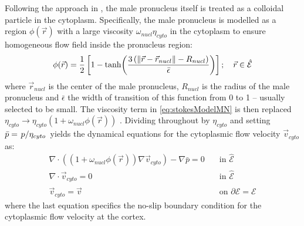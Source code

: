 Following the approach in \citep{tanaka2000simulation}, the male pronucleus itself is treated as a colloidal particle in the cytoplasm. Specifically, the male pronucleus is modelled as a region $\phi(\vec{r})$ with a large viscosity $\omega_{nucl}\eta_{cyto}$ in the cytoplasm to ensure homogeneous flow field inside the pronucleus region:
\begin{equation}
    \phi(\vec{r}) = \frac{1}{2}\left[1- \tanh(\frac{3\left(\norm{\vec{r} - \vec{r}_{nucl}} - R_{nucl}\right)}{\bar{\epsilon}})\right]; \quad \vec{r} \in \hat{\mathcal{E}}
\end{equation}
where $\vec{r}_{nucl}$ is the center of the male pronucleus, $R_{nucl}$ is the radius of the male pronucleus and $\bar{\epsilon}$ the width of transition of this function from \num{0} to \num{1} -- usually selected to be small. The viscosity term in \autoref{eq:stokesModelMN} is then replaced $\eta_{cyto} \rightarrow \eta_{cyto}(1 + \omega_{nucl}\phi(\vec{r}))$ \citep{tanaka2000simulation}. Dividing throughout by $\eta_{cyto}$ and setting $\bar{p} = \flatfrac{p}{\eta_{cyto}}$ yields the dynamical equations for the cytoplasmic flow velocity $\vec{v}_{cyto}$ as:
\begin{subequations}\label{eq:cytoFlowModelMN}
    \begin{align}
        \nabla\cdot\left((1 + \omega_{nucl}\phi(\vec{r}))\nabla\vec{v}_{cyto}\right) - \nabla \bar{p} = 0 & \quad \textrm{in }\hat{\mathcal{E}}\\
        \nabla\cdot\vec{v}_{cyto} = 0 & \quad \textrm{in }\hat{\mathcal{E}}\\
        \vec{v}_{cyto} = \vec{v} & \quad \textrm{on }\partial\hat{\mathcal{E}} = \mathcal{E}
    \end{align}
\end{subequations}
where the last equation specifics the no-slip boundary condition for the cytoplasmic flow velocity at the cortex.

